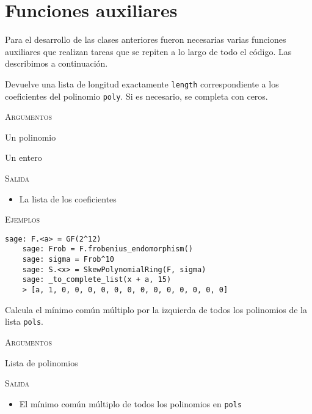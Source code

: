 \section{Funciones auxiliares}

Para el desarrollo de las clases anteriores fueron necesarias varias funciones auxiliares que realizan tareas que se repiten a lo largo de todo el código.
Las describimos a continuación.

\begin{description}[font=\ttfamily, style=nextline]
  \item[\_to\_complete\_list(poly, length)] Devuelve una lista de longitud exactamente \texttt{length} correspondiente a los coeficientes del polinomio \texttt{poly}.
  Si es necesario, se completa con ceros. 
  
  \textsc{Argumentos}
  \begin{description}[font=\normalfont\ttfamily]
    \item[poly] Un polinomio
    \item[length] Un entero 
  \end{description}

  \textsc{Salida}
  \begin{itemize}
    \item La lista de los coeficientes
  \end{itemize}
  
  \textsc{Ejemplos}
  \begin{lstlisting}[gobble=4]
    sage: F.<a> = GF(2^12)
    sage: Frob = F.frobenius_endomorphism()
    sage: sigma = Frob^10
    sage: S.<x> = SkewPolynomialRing(F, sigma)
    sage: _to_complete_list(x + a, 15)
    > [a, 1, 0, 0, 0, 0, 0, 0, 0, 0, 0, 0, 0, 0, 0]
  \end{lstlisting}

  \item[left\_lcm(pols)] Calcula el mínimo común múltiplo por la izquierda de todos los polinomios de la lista \texttt{pols}.
  
  \textsc{Argumentos}
  \begin{description}[font=\normalfont\ttfamily]
    \item[pols] Lista de polinomios
  \end{description}

  \textsc{Salida}
  \begin{itemize}
    \item El mínimo común múltiplo de todos los polinomios en \texttt{pols}
  \end{itemize}
  

\end{description}
